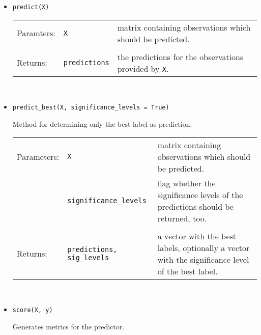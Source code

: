 \documentclass[twoside,11pt]{article}
\def\wo{~\\}
\begin{document}
\begin{appendices}
\begin{itemize}
        \item
          \texttt{predict(X)}
          \label{itm:cp_predict}

          \begin{tabu}{llX}
            Paramters: &\texttt{X}
                       &matrix containing observations
                        which should be predicted.
                        \\\\
            Returns:   &\texttt{predictions}
                       &the predictions for the
                        observations provided by
                        \texttt{X}.
          \end{tabu}
          \wo

        \item
          \texttt{predict\_best(X,
                  significance\_levels = True)}
          \label{itm:cp_predict_best}

          Method for determining only the best label as
          prediction.
          \\

          \begin{tabu}{lp{4cm}X}
            Parameters: &\texttt{X}
                        &matrix containing observations
                         which should be predicted.
                         \\
                        &\texttt{significance\_levels}
                        &flag whether the significance
                         levels of the predictions should
                         be returned, too.
                         \\\\
            Returns:    &\texttt{predictions,
                                 sig\_levels}
                        &a vector with the best labels,
                         optionally a vector with the
                         significance level of the best
                         label.
          \end{tabu}
          \wo

        \item
          \texttt{score(X, y)}
          \label{itm:cp_score}

          Generates metrics for the predictor.
          \\


\end{itemize}
\end{appendices}
\end{document}
